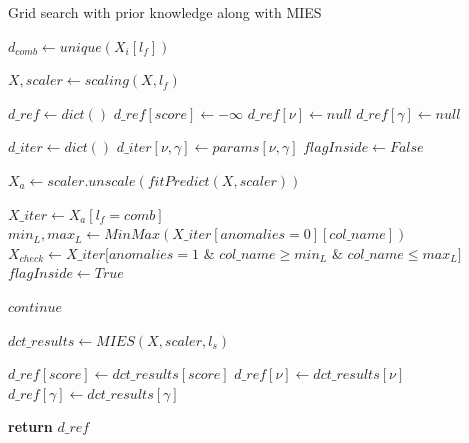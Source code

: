 \begin{algorithm}[]
\caption{Grid search with prior knowledge along with MIES}\label{alg:ch5-ocsvm-comms-gridsearch}
\begin{algorithmic}[1]

    \State $d_{comb} \gets unique(X_i[l_f])$
    
    \State $X, scaler \gets scaling(X, l_f)$
    
    \State $d\_ref \gets dict()$
    \State $d\_ref[score] \gets -\infty$
    \State $d\_ref[\nu] \gets null$
    \State $d\_ref[\gamma] \gets null$
    
    
        \State $d\_iter \gets dict()$
        \State $d\_iter[\nu, \gamma] \gets params[\nu, \gamma]$
        \State $flagInside \gets False$
        
        \State $X_{a} \gets scaler.unscale(fitPredict(X, scaler))$ 
        
            \State $X\_iter \gets X_{a}[l_f = comb]$
            \State $min_L, max_L \gets MinMax(X\_iter[anomalies = 0][col\_name])$
            \State $X_{check} \gets X\_iter[anomalies = 1$ \& $col\_name \geq min_L$ \& $col\_name \leq max_L]$
                \State $flagInside \gets True$
            \EndIf
        \EndFor
        
            \State $continue$
        \EndIf
        
        \State $dct\_results \gets MIES(X, scaler, l_s)$
        
            \State $d\_ref[score] \gets dct\_results[score]$
            \State $d\_ref[\nu] \gets dct\_results[\nu]$
            \State $d\_ref[\gamma] \gets dct\_results[\gamma]$
        \EndIf
        
    \EndFor
        
    \State \textbf{return} $d\_ref$
    
\EndProcedure
\end{algorithmic}
\end{algorithm}


